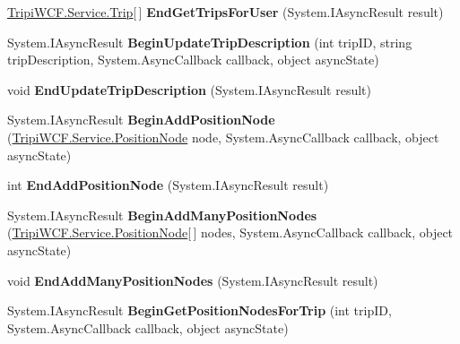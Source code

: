 \begin{DoxyCompactItemize}
\item 
\hypertarget{interface_i_trip_service_ad57b12311e0753b7f3b1c47f2da219eb}{
\hyperlink{class_tripi_w_c_f_1_1_service_1_1_trip}{TripiWCF.Service.Trip}\mbox{[}$\,$\mbox{]} {\bfseries EndGetTripsForUser} (System.IAsyncResult result)}
\label{interface_i_trip_service_ad57b12311e0753b7f3b1c47f2da219eb}

\item 
\hypertarget{interface_i_trip_service_a92fb1d528f49e637e6a404ec7067451d}{
System.IAsyncResult {\bfseries BeginUpdateTripDescription} (int tripID, string tripDescription, System.AsyncCallback callback, object asyncState)}
\label{interface_i_trip_service_a92fb1d528f49e637e6a404ec7067451d}

\item 
\hypertarget{interface_i_trip_service_aeed5f3cb84fc59f5eb538acd6756a526}{
void {\bfseries EndUpdateTripDescription} (System.IAsyncResult result)}
\label{interface_i_trip_service_aeed5f3cb84fc59f5eb538acd6756a526}

\item 
\hypertarget{interface_i_trip_service_a740f261ae2d3cdb5d57473f05d7403da}{
System.IAsyncResult {\bfseries BeginAddPositionNode} (\hyperlink{class_tripi_w_c_f_1_1_service_1_1_position_node}{TripiWCF.Service.PositionNode} node, System.AsyncCallback callback, object asyncState)}
\label{interface_i_trip_service_a740f261ae2d3cdb5d57473f05d7403da}

\item 
\hypertarget{interface_i_trip_service_a5f76b4a7687512857c9de09ae480d534}{
int {\bfseries EndAddPositionNode} (System.IAsyncResult result)}
\label{interface_i_trip_service_a5f76b4a7687512857c9de09ae480d534}

\item 
\hypertarget{interface_i_trip_service_ab2930b15213c89efc21d149687c5a041}{
System.IAsyncResult {\bfseries BeginAddManyPositionNodes} (\hyperlink{class_tripi_w_c_f_1_1_service_1_1_position_node}{TripiWCF.Service.PositionNode}\mbox{[}$\,$\mbox{]} nodes, System.AsyncCallback callback, object asyncState)}
\label{interface_i_trip_service_ab2930b15213c89efc21d149687c5a041}

\item 
\hypertarget{interface_i_trip_service_a57e8dd6c318566368660f4ec1d80c06e}{
void {\bfseries EndAddManyPositionNodes} (System.IAsyncResult result)}
\label{interface_i_trip_service_a57e8dd6c318566368660f4ec1d80c06e}

\item 
\hypertarget{interface_i_trip_service_af59f015a6ee2bcdae06759d153a0f87d}{
System.IAsyncResult {\bfseries BeginGetPositionNodesForTrip} (int tripID, System.AsyncCallback callback, object asyncState)}
\label{interface_i_trip_service_af59f015a6ee2bcdae06759d153a0f87d}


\end{DoxyCompactItemize}
